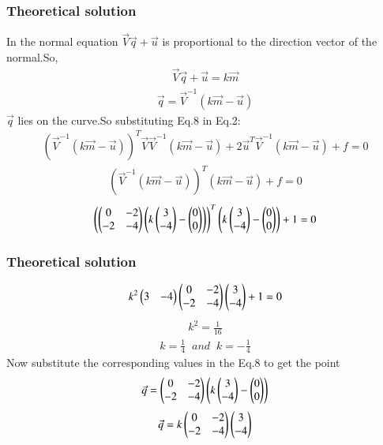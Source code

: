 \documentclass{beamer}
\begin{document}
    \begin{frame}
    \frametitle{Theoretical solution}
  In the normal equation $\Vec{V}\Vec{q}+\Vec{u}$ is proportional to the direction vector of the normal.So,
\begin{align}
 \Vec{V}\Vec{q}+\Vec{u}=k\Vec{m}
\end{align}
\begin{align}
 \Vec{q}=\Vec{V}^{-1}(k\Vec{m}-\Vec{u})
\end{align}
$\Vec{q}$ lies on the curve.So substituting Eq.8 in Eq.2:
\begin{align}
    (\Vec{V}^{-1}(k\Vec{m}-\Vec{u}))^T\Vec{V}\Vec{V}^{-1}(k\Vec{m}-\Vec{u})+2\Vec{u}^T\Vec{V}^{-1}(k\Vec{m}-\Vec{u})+f=0
\end{align}
\begin{align}
    (\Vec{V}^{-1}(k\Vec{m}-\Vec{u}))^T(k\Vec{m}-\Vec{u})+f=0
\end{align}
\begin{align}
    \left(\begin{pmatrix}0&-2\\-2&-4\end{pmatrix}\begin{pmatrix}k\begin{pmatrix}3\\-4\end{pmatrix}-\begin{pmatrix}0\\0\end{pmatrix}\end{pmatrix}\right)^T\begin{pmatrix}k\begin{pmatrix}3\\-4\end{pmatrix}-\begin{pmatrix}0\\0\end{pmatrix}\end{pmatrix} +1=0
\end{align}

    \end{frame}


   

     \begin{frame}
    \frametitle{Theoretical solution}
 \begin{align}
     k^2\begin{pmatrix}3&-4\end{pmatrix}\begin{pmatrix}0&-2\\-2&-4\end{pmatrix}\begin{pmatrix}3\\-4\end{pmatrix}+1=0
\end{align}
\begin{align}
    k^2=\frac{1}{16}
\end{align}
\begin{align}
    k=\frac{1}{4}\;\;and\;\;k=-\frac{1}{4}
\end{align}
Now substitute the corresponding values in the Eq.8 to get the point
\begin{align}
    \Vec{q}=\begin{pmatrix}0&-2\\-2&-4\end{pmatrix}\begin{pmatrix}k\begin{pmatrix}3\\-4\end{pmatrix}-\begin{pmatrix}0\\0\end{pmatrix}\end{pmatrix}
\end{align}
\begin{align}
    \Vec{q}=k\begin{pmatrix}0&-2\\-2&-4\end{pmatrix}\begin{pmatrix}3\\-4\end{pmatrix}
\end{align}

    \end{frame}
\end{document}
